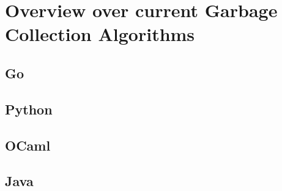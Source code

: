 \section{Overview over current Garbage Collection Algorithms}

\subsection{Go}
\subsection{Python}
\subsection{OCaml}
\subsection{Java}

